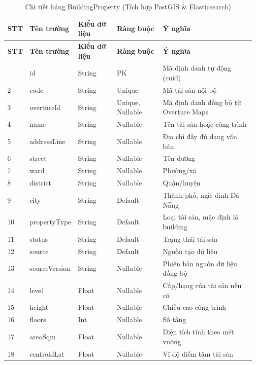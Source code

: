 \begin{longtable}{|p{0.7cm}|p{3.3cm}|p{1.9cm}|p{2.1cm}|p{5.4cm}|}
    \caption{Chi tiết bảng BuildingProperty (Tích hợp PostGIS \& Elasticsearch)}
    \label{tab:db_building_property} \\
    \hline
    \textbf{STT} & \textbf{Tên trường} & \textbf{Kiểu dữ liệu} & \textbf{Ràng buộc} & \textbf{Ý nghĩa} \\
    \hline
    \endfirsthead
    \hline
    \textbf{STT} & \textbf{Tên trường} & \textbf{Kiểu dữ liệu} & \textbf{Ràng buộc} & \textbf{Ý nghĩa} \\
    \hline
    \endhead
    \hline
    \endfoot
    \hline
    \endlastfoot
    1 & id & String & PK & Mã định danh tự động (cuid) \\ \hline
    2 & code & String & Unique & Mã tài sản nội bộ \\ \hline
    3 & overtureId & String & Unique, Nullable & Mã định danh đồng bộ từ Overture Maps \\ \hline
    4 & name & String & Nullable & Tên tài sản hoặc công trình \\ \hline
    5 & addressLine & String & Nullable & Địa chỉ đầy đủ dạng văn bản \\ \hline
    6 & street & String & Nullable & Tên đường \\ \hline
    7 & ward & String & Nullable & Phường/xã \\ \hline
    8 & district & String & Nullable & Quận/huyện \\ \hline
    9 & city & String & Default & Thành phố, mặc định Đà Nẵng \\ \hline
    10 & propertyType & String & Default & Loại tài sản, mặc định là building \\ \hline
    11 & status & String & Default & Trạng thái tài sản \\ \hline
    12 & source & String & Default & Nguồn tạo dữ liệu \\ \hline
    13 & sourceVersion & String & Nullable & Phiên bản nguồn dữ liệu đồng bộ \\ \hline
    14 & level & Float & Nullable & Cấp/hạng của tài sản nếu có \\ \hline
    15 & height & Float & Nullable & Chiều cao công trình \\ \hline
    16 & floors & Int & Nullable & Số tầng \\ \hline
    17 & areaSqm & Float & Nullable & Diện tích tính theo mét vuông \\ \hline
    18 & centroidLat & Float & Nullable & Vĩ độ điểm tâm tài sản \\ \hline

\end{longtable}
